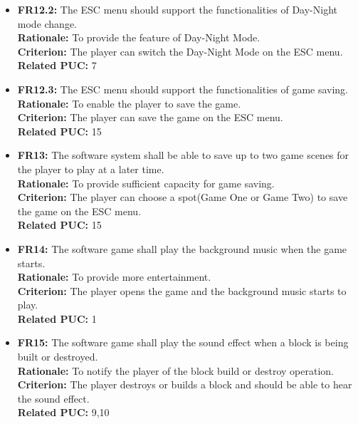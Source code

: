 \documentclass[12pt, titlepage]{article}
\begin{document}
\begin{itemize}
        
        \item \textbf{FR12.2:} The ESC menu should support the functionalities of Day-Night mode change.\\
        \textbf{Rationale:} To provide the feature of Day-Night Mode.\\
        \textbf{Criterion:} The player can switch the Day-Night Mode on the ESC menu.\\
        \textbf{Related PUC:} 7
        
        \item \textbf{FR12.3:} The ESC menu should support the functionalities of game saving.\\
        \textbf{Rationale:} To enable the player to save the game.\\
        \textbf{Criterion:} The player can save the game on the ESC menu.\\
        \textbf{Related PUC:} 15
        
        \item \textbf{FR13:} The software system shall be able to save up to two game scenes for the player to play at a later time.\\
        \textbf{Rationale:} To provide sufficient capacity for game saving.\\
        \textbf{Criterion:} The player can choose a spot(Game One or Game Two) to save the game on the ESC menu.\\
        \textbf{Related PUC:} 15
        
        \item \textbf{FR14:} The software game shall play the background music when the game starts.\\
        \textbf{Rationale:} To provide more entertainment.\\
        \textbf{Criterion:} The player opens the game and the background music starts to play.\\
        \textbf{Related PUC:} 1
        
        \item \textbf{FR15:} The software game shall play the sound effect when a block is being built or destroyed.\\
        \textbf{Rationale:} To notify the player of the block build or destroy operation.\\
        \textbf{Criterion:} The player destroys or builds a block and should be able to hear the sound effect.\\
        \textbf{Related PUC:} 9,10
        

\end{itemize}
\end{document}
